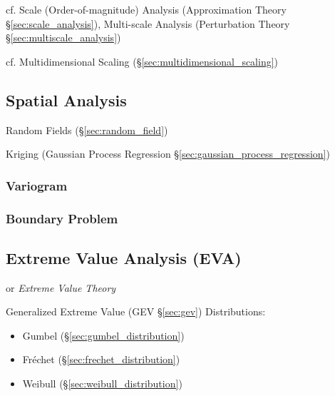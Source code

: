 \fist cf. Scale (Order-of-magnitude) Analysis (Approximation Theory
\S\ref{sec:scale_analysis}), Multi-scale Analysis (Perturbation Theory
\S\ref{sec:multiscale_analysis})

cf. Multidimensional Scaling (\S\ref{sec:multidimensional_scaling})



\subsection{Spatial Analysis}\label{sec:spatial_analysis}

Random Fields (\S\ref{sec:random_field})


Kriging (Gaussian Process Regression \S\ref{sec:gaussian_process_regression})



\subsubsection{Variogram}\label{sec:variogram}

\subsubsection{Boundary Problem}\label{sec:boundary_problem}



\subsection{Extreme Value Analysis (EVA)}\label{sec:eva}

or \emph{Extreme Value Theory}

Generalized Extreme Value (GEV \S\ref{sec:gev}) Distributions:

\begin{itemize}
  \item Gumbel (\S\ref{sec:gumbel_distribution})
  \item Fr\'echet (\S\ref{sec:frechet_distribution})
  \item Weibull (\S\ref{sec:weibull_distribution})
\end{itemize}

